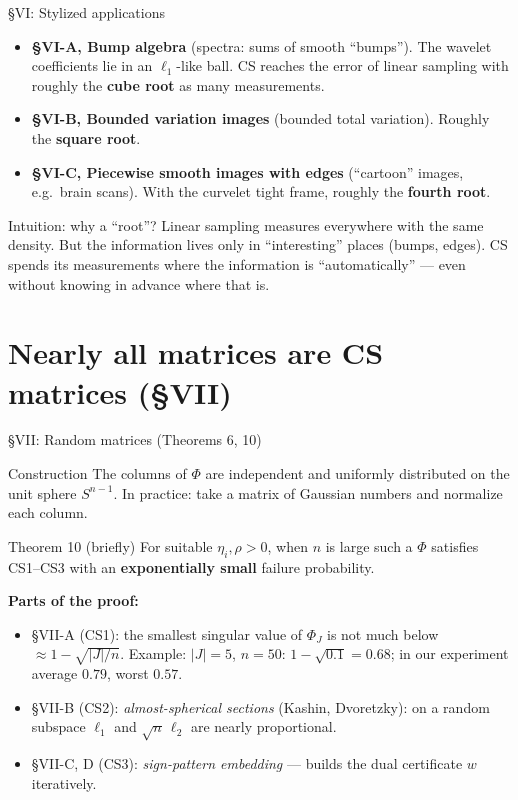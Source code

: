 \documentclass[aspectratio=169,11pt]{beamer}
\newcommand{\en}[1]{\textit{#1}}          %
\begin{document}
\begin{frame}{\S VI: Stylized applications}
  \begin{itemize}
    \item \textbf{\S VI-A, Bump algebra} (spectra: sums of smooth ``bumps'').
          The wavelet coefficients lie in an $\ell_1$-like ball. CS reaches the error of linear sampling with roughly the \textbf{cube root} as many measurements.
    \item \textbf{\S VI-B, Bounded variation images} (bounded total variation).
          Roughly the \textbf{square root}.
    \item \textbf{\S VI-C, Piecewise smooth images with edges} (``cartoon'' images, e.g.\ brain scans).
          With the curvelet tight frame, roughly the \textbf{fourth root}.
  \end{itemize}
  \begin{exampleblock}{Intuition: why a ``root''?}
    Linear sampling measures everywhere with the same density. But the information lives only in ``interesting'' places (bumps, edges).
    CS spends its measurements where the information is ``automatically'' --- even without knowing in advance where that is.
  \end{exampleblock}
\end{frame}

\section{Nearly all matrices are CS matrices (\S VII)}

\begin{frame}{\S VII: Random matrices (Theorems 6, 10)}
  \begin{block}{Construction}
    The columns of $\Phi$ are independent and uniformly distributed on the unit sphere $S^{n-1}$.
    In practice: take a matrix of Gaussian numbers and normalize each column.
  \end{block}
  \begin{block}{Theorem 10 (briefly)}
    For suitable $\eta_i,\rho>0$, when $n$ is large such a $\Phi$ satisfies CS1--CS3 with an \textbf{exponentially small} failure probability.
  \end{block}
  \textbf{Parts of the proof:}
  \begin{itemize}
    \item \S VII-A (CS1): the smallest singular value of $\Phi_J$ is not much below $\approx1-\sqrt{|J|/n}$.
          {\small Example: $|J|=5$, $n=50$: $1-\sqrt{0.1}=0.68$; in our experiment average $0.79$, worst $0.57$.}
    \item \S VII-B (CS2): \en{almost-spherical sections} (Kashin, Dvoretzky): on a random subspace $\ell_1$ and $\sqrt n\,\ell_2$ are nearly proportional.
    \item \S VII-C, D (CS3): \en{sign-pattern embedding} --- builds the dual certificate $w$ iteratively.
  \end{itemize}
\end{frame}
\end{document}
